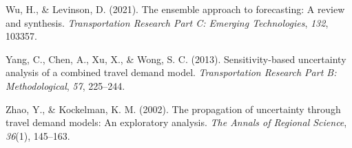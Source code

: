 \documentclass[fancy, masters, twoside]{byuthesis}
\newlength{\cslhangindent}
\newlength{\cslentryspacingunit} %
\newenvironment{CSLReferences}[2] %
 {%
  \setlength{\parindent}{0pt}
  \ifodd #1
  \let\oldpar\par
  \def\par{\hangindent=\cslhangindent\oldpar}
  \fi
  \setlength{\parskip}{#2\cslentryspacingunit}
 }%
 {}
\begin{document}
\begin{CSLReferences}{1}{0}
\leavevmode{}%
Wu, H., \& Levinson, D. (2021). The ensemble approach to forecasting: {A} review and synthesis. \emph{Transportation Research Part C: Emerging Technologies}, \emph{132}, 103357.

\leavevmode{}%
Yang, C., Chen, A., Xu, X., \& Wong, S. C. (2013). Sensitivity-based uncertainty analysis of a combined travel demand model. \emph{Transportation Research Part B: Methodological}, \emph{57}, 225--244.

\leavevmode{}%
Zhao, Y., \& Kockelman, K. M. (2002). The propagation of uncertainty through travel demand models: {An} exploratory analysis. \emph{The Annals of Regional Science}, \emph{36}(1), 145--163.

\end{CSLReferences}

\cleardoublepage
\pagestyle{byu}

%
\end{document}
